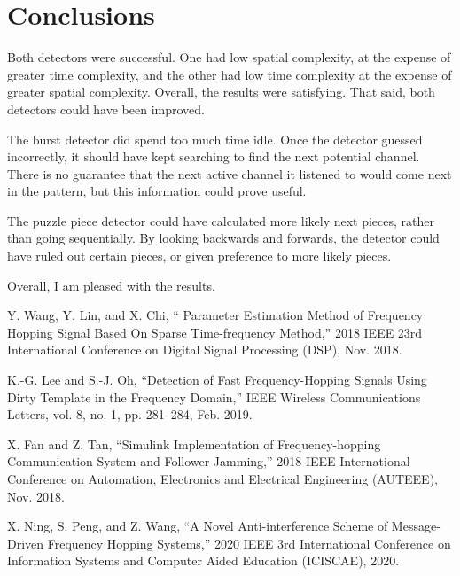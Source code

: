 \documentclass[conference]{IEEEtran}
\begin{document}
\section{Conclusions}

Both detectors were successful.
One had low spatial complexity, at the expense of greater time complexity, and the other had low time complexity at the expense of greater spatial complexity.
Overall, the results were satisfying.
That said, both detectors could have been improved.

The burst detector did spend too much time idle.
Once the detector guessed incorrectly, it should have kept searching to find the next potential channel.
There is no guarantee that the next active channel it listened to would come next in the pattern, but this information could prove useful.

The puzzle piece detector could have calculated more likely next pieces, rather than going sequentially.
By looking backwards and forwards, the detector could have ruled out certain pieces, or given preference to more likely pieces.

Overall, I am pleased with the results.

\begin{thebibliography}{00}

 Y. Wang, Y. Lin, and X. Chi, `` Parameter Estimation Method of Frequency Hopping Signal Based On Sparse Time-frequency Method,'' 2018 IEEE 23rd International Conference on Digital Signal Processing (DSP), Nov. 2018.

 K.-G. Lee and S.-J. Oh, “Detection of Fast Frequency-Hopping Signals Using Dirty Template in the Frequency Domain,” IEEE Wireless Communications Letters, vol. 8, no. 1, pp. 281–284, Feb. 2019.

 X. Fan and Z. Tan, “Simulink Implementation of Frequency-hopping Communication System and Follower Jamming,” 2018 IEEE International Conference on Automation, Electronics and Electrical Engineering (AUTEEE), Nov. 2018. 

 X. Ning, S. Peng, and Z. Wang, “A Novel Anti-interference Scheme of Message-Driven Frequency Hopping Systems,” 2020 IEEE 3rd International Conference on Information Systems and Computer Aided Education (ICISCAE), 2020. 

\end{thebibliography}
\end{document}
